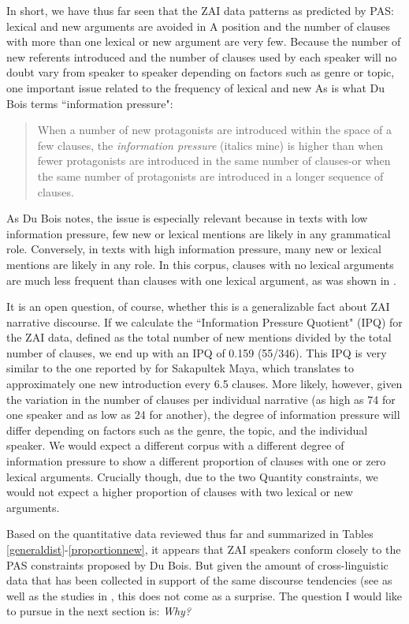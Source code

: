 In short, we have thus far seen that the ZAI data patterns as predicted by PAS: lexical and new arguments are avoided in A position and the number of clauses with more than one lexical or new argument are very few. Because the number of new referents introduced and the number of clauses used by each speaker will no doubt vary from speaker to speaker depending on factors such as genre or topic, one important issue related to the frequency of lexical and new As is what Du Bois terms ``information pressure": 

\begin{quote}
When a number of new protagonists are introduced within the space of a few clauses, the \textit{information pressure} (italics mine) is higher than when fewer protagonists are introduced in the same number of clauses-or when the same number of protagonists are introduced in a longer sequence of clauses. \citep[834]{dubois1987}
\end{quote}

As Du Bois notes, the issue is especially relevant because in texts with low information pressure, few new or lexical mentions are likely in any grammatical role. Conversely, in texts with high information pressure, many new or lexical mentions are likely in any role. In this corpus, clauses with no lexical arguments are much less frequent than clauses with one lexical argument, as was shown in .

It is an open question, of course, whether this is a generalizable fact about ZAI narrative discourse. If we calculate the ``Information Pressure Quotient" (IPQ) for the ZAI data, defined as the total number of new mentions divided by the total number of clauses, we end up with an IPQ of 0.159 (55/346). This IPQ is very similar to the one reported by \citet[834]{dubois1987} for Sakapultek Maya, which translates to approximately one new introduction every 6.5 clauses. More likely, however, given the variation in the number of clauses per individual narrative (as high as 74 for one speaker and as low as 24 for another), the degree of information pressure will differ depending on factors such as the genre, the topic, and the individual speaker. We would expect a different corpus with a different degree of information pressure to show a different proportion of clauses with one or zero lexical arguments. Crucially though, due to the two Quantity constraints, we would not expect a higher proportion of clauses with two lexical or new arguments.

Based on the quantitative data reviewed thus far and summarized in Tables \ref{generaldist}-\ref{proportionnew}, it appears that ZAI speakers conform closely to the PAS constraints proposed by Du Bois. But given the amount of cross-linguistic data that has been collected in support of the same discourse tendencies (see  as well as the studies in \citet{dubois2003}, this does not come as a surprise. The question I would like to pursue in the next section is: \textit{Why?}
 


